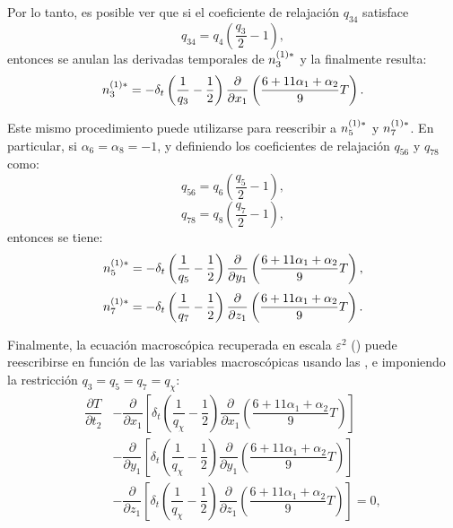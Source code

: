 Por lo tanto, es posible ver que si el coeficiente de relajaci\'on $q_{34}$ satisface
\begin{equation}
	q_{34} = q_4 \left( \dfrac{q_3}{2} - 1 \right),
\end{equation}
entonces se anulan las derivadas temporales de $n_{3}^{(1)*}$ y la  finalmente resulta:
\begin{equation}
	n_{3}^{(1)*} = -\delta_t \left( \dfrac{1}{q_3} - \dfrac{1}{2} \right) \dfrac{\partial}{\partial x_1} \left( \dfrac{6 + 11\alpha_1+\alpha_2}{9}T \right).
	\label{eq:n3star_macro 3d}
\end{equation}

Este mismo procedimiento puede utilizarse para reescribir a $n_{5}^{(1)*}$ y $n_{7}^{(1)*}$. En particular, si $\alpha_6 = \alpha_8 = -1$, y definiendo los coeficientes de relajaci\'on $q_{56}$ y $q_{78}$ como:
\begin{equation}
	q_{56} = q_6 \left( \dfrac{q_{5}}{2} - 1 \right),
\end{equation}
\begin{equation}
	q_{78} = q_8 \left( \dfrac{q_{7}}{2} - 1 \right),
\end{equation}
entonces se tiene:
\begin{equation}
	n_{5}^{(1)*} = -\delta_t \left( \dfrac{1}{q_5} - \dfrac{1}{2} \right) \dfrac{\partial}{\partial y_1} \left( \dfrac{6 + 11\alpha_1+\alpha_2}{9}T \right),
	\label{eq:n5star_macro 3d}
\end{equation}
\begin{equation}
	n_{7}^{(1)*} = -\delta_t \left( \dfrac{1}{q_7} - \dfrac{1}{2} \right) \dfrac{\partial}{\partial z_1} \left( \dfrac{6 + 11\alpha_1+\alpha_2}{9}T \right).
	\label{eq:n7star_macro 3d}
\end{equation}

Finalmente, la ecuaci\'on macrosc\'opica recuperada en escala $\varepsilon^2$ () puede reescribirse en funci\'on de las variables macrosc\'opicas usando las , e imponiendo la restricci\'on $q_3=q_5=q_7=q_{\chi}$:
\begin{equation}
	\begin{aligned}
		\dfrac{\partial T}{\partial t_2} 
		&- \dfrac{\partial}{\partial x_1}\left[ \delta_t \left( \dfrac{1}{q_{\chi}} - \dfrac{1}{2} \right) \dfrac{\partial}{\partial x_1} \left( \dfrac{6 + 11\alpha_1+\alpha_2}{9}T \right) \right] \\
		&- \dfrac{\partial}{\partial y_1}\left[ \delta_t \left( \dfrac{1}{q_{\chi}} - \dfrac{1}{2} \right) \dfrac{\partial}{\partial y_1} \left( \dfrac{6 + 11\alpha_1+\alpha_2}{9}T \right) \right] \\
		&- \dfrac{\partial}{\partial z_1}\left[ \delta_t \left( \dfrac{1}{q_{\chi}} - \dfrac{1}{2} \right) \dfrac{\partial}{\partial z_1} \left( \dfrac{6 + 11\alpha_1+\alpha_2}{9}T \right) \right] = 0,
	\end{aligned}
\end{equation}

